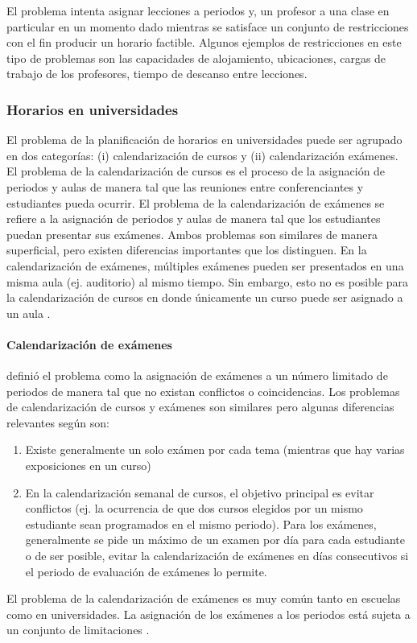 \documentclass[spanish,draft,12pt,headsepline,footsepline,paper=letter]{scrreprt}
\begin{document}
El problema intenta asignar lecciones a periodos y, un profesor a una clase en particular en un momento dado mientras se satisface un conjunto de restricciones con el fin producir un horario factible. Algunos ejemplos de restricciones en este tipo de problemas son las capacidades de alojamiento, ubicaciones, cargas de trabajo de los profesores, tiempo de descanso entre lecciones.

\subsubsection{Horarios en universidades}

El problema de la planificación de horarios en universidades puede ser agrupado en dos categorías: (i) calendarización de cursos y (ii) calendarización exámenes.
El problema de la calendarización de cursos es el proceso de la asignación de periodos y aulas de manera tal que las reuniones entre conferenciantes y estudiantes pueda ocurrir.
El problema de la calendarización de exámenes se refiere a la asignación de periodos y aulas de manera tal que los estudiantes puedan presentar sus exámenes.
Ambos problemas son similares de manera superficial, pero existen diferencias importantes que los distinguen.
En la calendarización de exámenes, múltiples exámenes pueden ser presentados en una misma aula (ej. auditorio) al mismo tiempo.
Sin embargo, esto no es posible para la calendarización de cursos en donde únicamente un curso puede ser asignado a un aula \citep[p.~11]{abdullah06heuristic-approaches}.

\paragraph{Calendarización de exámenes}

\citet[p.~4]{carter95recent-developments} definió el problema como la asignación de exámenes a un número limitado de periodos de manera tal que no existan conflictos o coincidencias. Los problemas de calendarización de cursos y exámenes son similares pero algunas diferencias relevantes según \citet[p.~159]{werra85an-introduction-to-timetabling} son:
\begin{enumerate}[a]
\item Existe generalmente un solo exámen por cada tema (mientras que hay varias exposiciones en un curso)
\item En la calendarización semanal de cursos, el objetivo principal es evitar conflictos (ej. la ocurrencia de que dos cursos elegidos por un mismo estudiante sean programados en el mismo periodo). Para los exámenes, generalmente se pide un máximo de un examen por día para cada estudiante o de ser posible, evitar la calendarización de exámenes en días consecutivos si el periodo de evaluación de exámenes lo permite.
\end{enumerate}
El problema de la calendarización de exámenes es muy común tanto en escuelas como en universidades. La asignación de los exámenes a los periodos está sujeta a un conjunto de limitaciones \citep[p.~12]{abdullah06heuristic-approaches}.
\end{document}
